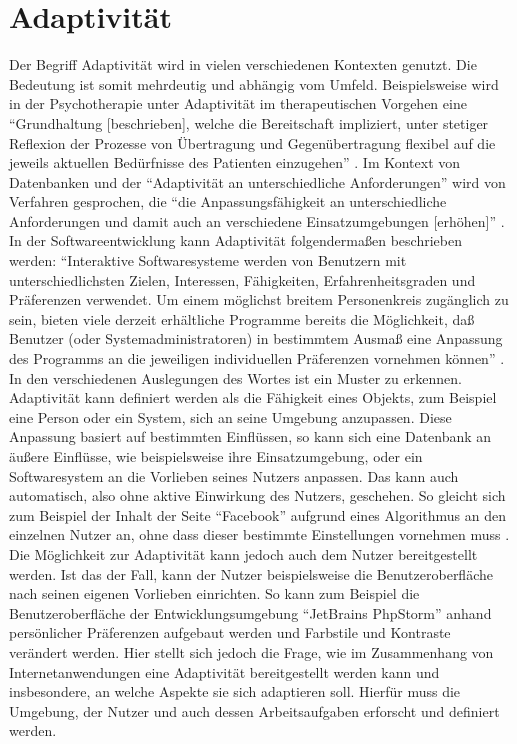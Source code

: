 \documentclass[12pt, paper=a4, bibtotoc, toc=listof, headsepline=true, numbers=endperiod]{scrreprt}
\begin{document}
\chapter{Adaptivität}
Der Begriff Adaptivität wird in vielen verschiedenen Kontexten genutzt. Die Bedeutung ist somit mehrdeutig und abhängig vom Umfeld. Beispielsweise wird in der Psychotherapie unter Adaptivität im therapeutischen Vorgehen eine \enquote{Grundhaltung [beschrieben], welche die Bereitschaft impliziert, unter stetiger Reflexion der Prozesse von Übertragung und Gegenübertragung flexibel auf die jeweils aktuellen Bedürfnisse des Patienten einzugehen} \cite[S.45]{woeller2014tiefenpsychologisch}. Im Kontext von Datenbanken und der \enquote{Adaptivität an unterschiedliche Anforderungen} wird von Verfahren gesprochen, die \enquote{die Anpassungsfähigkeit an unterschiedliche Anforderungen und damit auch an verschiedene Einsatzumgebungen [erhöhen]} \cite[][S.112]{loeser2013web}.
In der Softwareentwicklung kann Adaptivität folgendermaßen beschrieben werden: \enquote{Interaktive Softwaresysteme werden von Benutzern mit unterschiedlichsten Zielen, Interessen, Fähigkeiten, Erfahrenheitsgraden und Präferenzen verwendet. Um einem möglichst breitem Personenkreis zugänglich zu sein, bieten viele derzeit erhältliche Programme bereits die Möglichkeit, daß Benutzer (oder Systemadministratoren) in bestimmtem Ausmaß eine Anpassung des Programms an die jeweiligen individuellen Präferenzen vornehmen können} \cite[S.1]{Kobsa1993}.
\newline In den verschiedenen Auslegungen des Wortes ist ein Muster zu erkennen. Adaptivität kann definiert werden als die Fähigkeit eines Objekts, zum Beispiel eine Person oder ein System, sich an seine Umgebung anzupassen. Diese Anpassung basiert auf bestimmten Einflüssen, so kann sich eine Datenbank an äußere Einflüsse, wie beispielsweise ihre Einsatzumgebung, oder ein Softwaresystem an die Vorlieben seines Nutzers anpassen. Das kann auch automatisch, also ohne aktive Einwirkung des Nutzers, geschehen. So gleicht sich zum Beispiel der Inhalt der Seite \enquote{Facebook} aufgrund eines Algorithmus an den einzelnen Nutzer an, ohne dass dieser bestimmte Einstellungen vornehmen muss \cite{Rixecker2016}. Die Möglichkeit zur Adaptivität kann jedoch auch dem Nutzer bereitgestellt werden. Ist das der Fall, kann der Nutzer beispielsweise die Benutzeroberfläche nach seinen eigenen Vorlieben einrichten. So kann zum Beispiel die Benutzeroberfläche der Entwicklungsumgebung \enquote{JetBrains PhpStorm} anhand persönlicher Präferenzen aufgebaut werden und Farbstile und Kontraste verändert werden.
\newline Hier stellt sich jedoch die Frage, wie im Zusammenhang von Internetanwendungen eine Adaptivität bereitgestellt werden kann und insbesondere, an welche Aspekte sie sich adaptieren soll. Hierfür muss die Umgebung, der Nutzer und auch dessen Arbeitsaufgaben erforscht und definiert werden.
\end{document}
